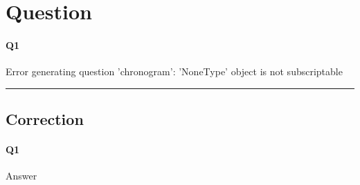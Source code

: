 
\section{Question}


\paragraph{Q1}

Error generating question 'chronogram': 'NoneType' object is not subscriptable


\hrule width 1\linewidth
\pagebreak

\subsection{Correction}


\paragraph{Q1}

Answer
\pagebreak